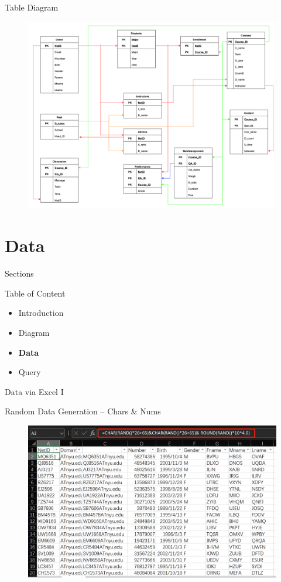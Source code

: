 \documentclass[a4paper,10pt]{beamer}
\begin{document}
\begin{frame}{Table Diagram}
\begin{figure}[H]
    \includegraphics[width=\textwidth]{Table.png}
\end{figure}
\end{frame}

\section{Data}
\begin{frame}{Sections}
\begin{block}{Table of Content}
\begin{itemize}
    \item Introduction
    \item Diagram
    \item \textbf{Data}
    \item Query
\end{itemize}
\end{block}
\end{frame}

\begin{frame}{Data via Excel I}
\begin{block}{Random Data Generation -- Chars \& Nums}
\begin{figure}[H]
    \includegraphics[width=\textwidth]{Data1.png}
\end{figure}
\end{block}
\end{frame}
\end{document}
